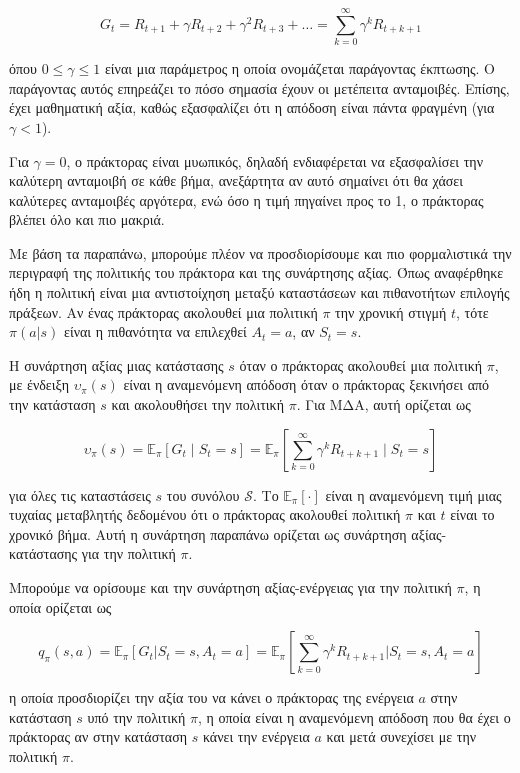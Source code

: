 \begin{equation}
    G_t = R_{t+1} + γ R_{t+2} + γ^2 R_{t+3} + \ldots = \sum_{k=0}^{\infty}γ^k R_{t+k+1}
\end{equation}

όπου $ 0 \leq γ \leq 1$ είναι μια παράμετρος η οποία ονομάζεται παράγοντας έκπτωσης.
Ο παράγοντας αυτός επηρεάζει το πόσο σημασία έχουν οι μετέπειτα ανταμοιβές.
Επίσης, έχει μαθηματική αξία, καθώς εξασφαλίζει ότι η απόδοση είναι πάντα φραγμένη (για $γ < 1$).

Για $γ = 0$, ο πράκτορας είναι μυωπικός, δηλαδή ενδιαφέρεται να εξασφαλίσει την καλύτερη ανταμοιβή σε κάθε βήμα,
ανεξάρτητα αν αυτό σημαίνει ότι θα χάσει καλύτερες ανταμοιβές αργότερα, ενώ όσο η τιμή πηγαίνει προς το 1,
ο πράκτορας βλέπει όλο και πιο μακριά.

Με βάση τα παραπάνω, μπορούμε πλέον να προσδιορίσουμε και πιο φορμαλιστικά την περιγραφή της πολιτικής του πράκτορα και της συνάρτησης αξίας.
Όπως αναφέρθηκε ήδη η πολιτική είναι μια αντιστοίχηση μεταξύ καταστάσεων και πιθανοτήτων επιλογής πράξεων.
Αν ένας πράκτορας ακολουθεί μια πολιτική $π$ την χρονική στιγμή $t$,
τότε $π(a|s)$ είναι η πιθανότητα να επιλεχθεί $A_t = a$, αν $S_t =s$.

Η συνάρτηση αξίας μιας κατάστασης $s$ όταν ο πράκτορας ακολουθεί μια πολιτική $π$,
με ένδειξη $υ_π(s)$ είναι η αναμενόμενη απόδοση όταν ο πράκτορας ξεκινήσει από την κατάσταση $s$
και ακολουθήσει την πολιτική $π$. Για ΜΔΑ, αυτή ορίζεται ως

\begin{equation}
    υ_π(s) = \mathbb{E}_π[G_t\;|\;S_t = s] = \mathbb{E}_π \left[ \sum_{k=0}^{\infty}γ^kR_{t+k+1}\;\bigg|\;S_t = s\right]
\end{equation}

για όλες τις καταστάσεις $s$ του συνόλου $\mathcal{S}$.
Το $\mathbb{E}_π[\cdot]$ είναι η αναμενόμενη τιμή μιας τυχαίας μεταβλητής δεδομένου ότι ο πράκτορας ακολουθεί πολιτική
$π$ και $t$ είναι το χρονικό βήμα. Αυτή η συνάρτηση παραπάνω ορίζεται ως συνάρτηση αξίας-κατάστασης για την πολιτική $π$.

Μπορούμε να ορίσουμε και την συνάρτηση αξίας-ενέργειας για την πολιτική $π$, η οποία ορίζεται ως

\begin{equation}
    q_π(s,a) = \mathbb{E}_π[G_t | S_t = s, A_t = a] = \mathbb{E}_π\left[ \sum_{k=0}^{\infty} γ^k R_{t+k+1} \bigg| S_t = s, A_t = a\right]
\end{equation}

η οποία προσδιορίζει την αξία του να κάνει ο πράκτορας της ενέργεια $a$ στην κατάσταση $s$ υπό την πολιτική $π$,
η οποία είναι η αναμενόμενη απόδοση που θα έχει ο πράκτορας αν στην κατάσταση $s$ κάνει την ενέργεια $a$ και μετά συνεχίσει με την πολιτική $π$.

